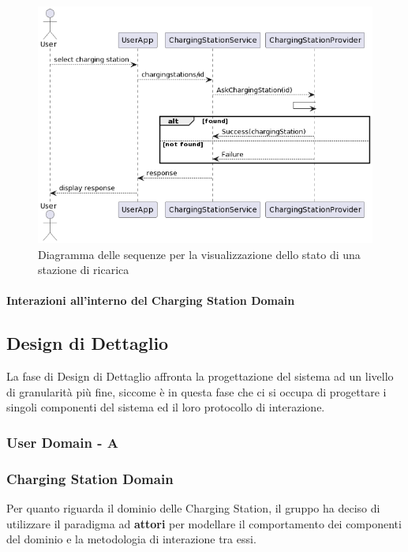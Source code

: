 \begin{figure}[htbp]
    \centering
    \includegraphics[width=\textwidth]{images/ask-station.png}
    \caption{Diagramma delle sequenze per la visualizzazione dello stato di una stazione di ricarica}
    \label{fig:ask-station}
\end{figure}


\paragraph{Interazioni all'interno del Charging Station Domain}

\subsection*{Design di Dettaglio}
La fase di Design di Dettaglio affronta la progettazione del sistema ad un livello di granularità più fine, siccome è in questa fase che ci si occupa di progettare i singoli componenti del sistema ed il loro protocollo di interazione.\\
\subsubsection{User Domain - A}

\subsubsection{Charging Station Domain}
Per quanto riguarda il dominio delle Charging Station, il gruppo ha deciso di utilizzare il paradigma ad \textbf{attori} per modellare il comportamento dei componenti del dominio e la
metodologia di interazione tra essi. \\


